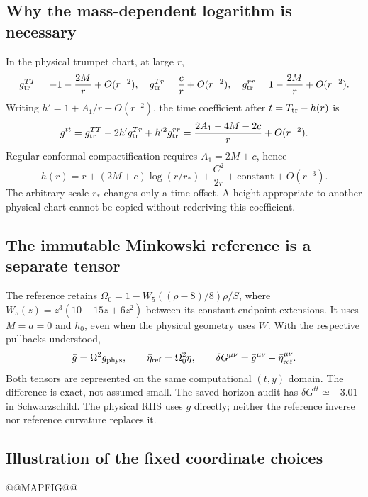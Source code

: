 \documentclass[11pt,letterpaper]{article}
\newcommand{\G}{\bar g}
\begin{document}
\subsection{Why the mass-dependent logarithm is necessary}
In the physical trumpet chart, at large $r$,
\begin{equation}
 g^{TT}_{\rm tr}=-1-\frac{2M}{r}+O(r^{-2}),\quad
 g^{Tr}_{\rm tr}=\frac{c}{r}+O(r^{-2}),\quad
 g^{rr}_{\rm tr}=1-\frac{2M}{r}+O(r^{-2}).
\end{equation}
Writing $h'=1+A_1/r+O(r^{-2})$, the time coefficient after $t=T_{\rm tr}-h(r)$ is
\begin{equation}
 g^{tt}=g^{TT}_{\rm tr}-2h'g^{Tr}_{\rm tr}+h'^2g^{rr}_{\rm tr}
 =\frac{2A_1-4M-2c}{r}+O(r^{-2}).
\end{equation}
Regular conformal compactification requires $A_1=2M+c$, hence
\begin{equation}
 h(r)=r+(2M+c)\log(r/r_*)+\frac{C^2}{2r}+\text{constant}+O(r^{-3}).
\end{equation}
The arbitrary scale $r_*$ changes only a time offset. A height appropriate to another physical chart cannot be copied without rederiving this coefficient.

\subsection{The immutable Minkowski reference is a separate tensor}
The reference retains $\Omega_0=1-W_5((\rho-8)/8)\rho/S$, where
$W_5(z)=z^3(10-15z+6z^2)$ between its constant endpoint extensions. It uses $M=a=0$ and $h_0$, even when the physical geometry uses $W$. With the respective pullbacks understood,
\begin{equation}
 \G=\Omega^2g_{\rm phys},\qquad
 \bar\eta_{\rm ref}=\Omega_0^2\eta,\qquad
 \delta G^{\mu\nu}=\G^{\mu\nu}-\bar\eta_{\rm ref}^{\mu\nu}.
\end{equation}
Both tensors are represented on the same computational $(t,y)$ domain. The difference is exact, not assumed small. The saved horizon audit has $\delta G^{tt}\simeq-3.01$ in Schwarzschild. The physical RHS uses $\G$ directly; neither the reference inverse nor reference curvature replaces it.

\clearpage
\subsection{Illustration of the fixed coordinate choices}
@@MAPFIG@@
\end{document}
